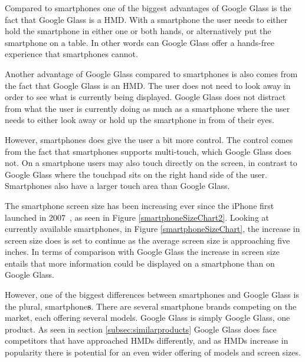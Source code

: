 Compared to smartphones one of the biggest advantages of Google Glass is the fact that Google Glass is a HMD. With a smartphone the user needs to either hold the smartphone in either one or both hands, or alternatively put the smartphone on a table. In other words can Google Glass offer a hands-free experience that smartphones cannot.

Another advantage of Google Glass compared to smartphones is also comes from the fact that Google Glass is an HMD. The user does not need to look away in order to see what is currently being displayed. Google Glass does not distract from what the user is currently doing as much as a smartphone where the user needs to either look away or hold up the smartphone in from of their eyes.

However, smartphones does give the user a bit more control. The control comes from the fact that smartphones supports multi-touch, which Google Glass does not. On a smartphone users may also touch directly on the screen, in contrast to Google Glass where the touchpad sits on the right hand side of the user. Smartphones also have a larger touch area than Google Glass.

The smartphone screen size has been increasing ever since the iPhone first launched in 2007~\cite{iphoneWiki}, as seen in Figure \ref{smartphoneSizeChart2}. Looking at currently available smartphones, in Figure \ref{smartphoneSizeChart}, the increase in screen size does is set to continue as the average screen size is approaching five inches. In terms of comparison with Google Glass the increase in screen size entails that more information could be displayed on a smartphone than on Google Glass.

However, one of the biggest differences between smartphones and Google Glass is the plural, smartphone\textbf{s}. There are several smartphone brands competing on the market, each offering several models. Google Glass is simply Google Glass, one product. As seen in section \ref{subsec:similarproducts} Google Glass does face competitors that have approached HMDs differently, and as HMDs increase in popularity there is potential for an even wider offering of models and screen sizes.

